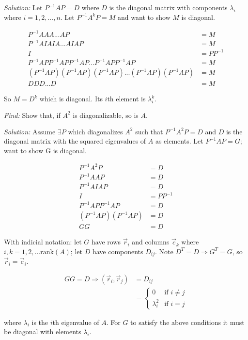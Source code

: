 \documentclass[11pt]{homework}
\begin{document}
\emph{Solution:}
\newline
Let $P^{-1}AP = D$ where $D$ is the diagonal matrix 
with components $\lambda_i$ where $i=1,2,...,n$.
Let $P^{-1} A^k P = M$ and want to show 
$M$ is diagonal.

\begin{align*}
P^{-1} A A A ... A P &= M \\
P^{-1} A I A I A ...  A I A P &= M \\
  I &= P P^{-1} \\
P^{-1} A P P^{-1}  A P P^{-1}  A P  ...  P^{-1} A P P^{-1}  A P &= M \\
(P^{-1} A P)( P^{-1}  A P)( P^{-1}  A P)...  (P^{-1} A P)( P^{-1}  A P) &= M \\
D D D ...  D &= M
\end{align*}

So $M = D^k$ which is diagonal. Its $i$th element is $\lambda_i^k$.

\newpage
{}
\emph{Find:}
\newline
Show that, if $A^2$ is diagonalizable, so is $A$.

\emph{Solution:}
\newline
Assume $\exists P$ which diagonalizes $A^2$ such that $P^{-1}A^2P=D$
and $D$ is the diagonal matrix with the squared eigenvalues of $A$ as
elements.
Let $P^{-1}AP=G$; want to show G is diagonal.

\begin{align*}
P^{-1} A^2 P &= D \\
P^{-1} A A P &= D \\
P^{-1} A I A P &= D \\
  I &= P P^{-1} \\
P^{-1} A P P^{-1} A P &= D \\
(P^{-1} A P) ( P^{-1} A P) &= D \\
  G G &= D
\end{align*}

With indicial notation:
let $G$ have rows $\vec r_i$ and columns $\vec c_k$ where $i,k=1,2,... \text{rank}(A)$;
let $D$ have components $D_{ij}$.
Note $D^T=D \Rightarrow G^T=G$, so $\vec r_i = \vec c_i$.

\begin{align*}
GG=D \Rightarrow ( \vec r_i, \vec r_j) &= D_{ij} \\
  &= 
  \left\{
  \begin{array}{cc}
    0 & \text{if } i \neq j \\
    \lambda_i^2 & \text{if } i = j
  \end{array}
  \right.
\end{align*}

where $\lambda_i$ is the $i$th eigenvalue of $A$.
For $G$ to satisfy the above conditions it must be diagonal 
with elements $\lambda_i$.
\end{document}
